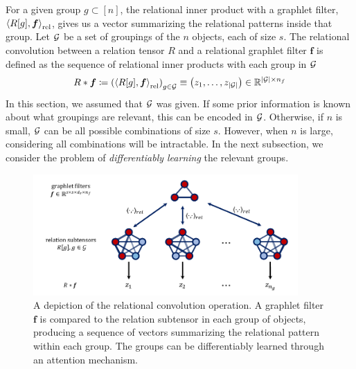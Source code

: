 For a given group $g \subset [n]$, the relational inner product with a graphlet filter, $\left \langle R[g], \bm{f} \right\rangle_\mathrm{rel}$, gives us a vector summarizing the relational patterns inside that group. Let ${\mathcal{G}}$ be a set of groupings of the $n$ objects, each of size $s$. The relational convolution between a relation tensor $R$ and a relational graphlet filter $\bm{f}$ is defined as the sequence of relational inner products with each group in ${\mathcal{G}}$
\begin{equation}\label{eq:relational_convolution}
    R \ast \bm{f} \coloneq \left( \left\langle R[g], \boldsymbol{f} \right\rangle_\mathrm{rel} \right)_{g \in {\mathcal{G}}} \equiv \left(z_1, \ldots, z_{\left\lvert{\mathcal{G}}\right\rvert}\right) \in \mathbb{R}^{\left\lvert{\mathcal{G}}\right\rvert \times n_f}
\end{equation}
In this section, we assumed that ${\mathcal{G}}$ was given.
If some prior information is known about what groupings are relevant, this can be encoded in ${\mathcal{G}}$. Otherwise, if $n$ is small, ${\mathcal{G}}$ can be all possible combinations of size $s$. However, when $n$ is large, considering all combinations will be intractable. In the next subsection, we consider the problem of \textit{differentiably learning} the relevant groups.


\begin{figure}[t]
    \centering
    \includegraphics[width=0.9\textwidth]{figs/relconv_figs_updated.pdf}
    \caption{A depiction of the relational convolution operation. A graphlet filter $\bm{f}$ is compared to the relation subtensor in each group of objects, producing a sequence of vectors summarizing the relational pattern within each group. The groups can be differentiably learned through an attention mechanism.
    }\label{fig:relconvdiagram}
    \vskip-7.5pt
\end{figure}

